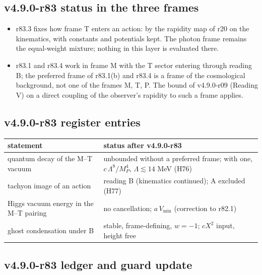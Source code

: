 \subsection*{v4.9.0-r83 status in the three frames}
\label{subsec:v490-r83-frames}

\begin{itemize}[leftmargin=2em]
\item r83.3 fixes how frame T enters an action: by the rapidity map of r20 on the kinematics, with constants and potentials kept.  The
photon frame remains the equal-weight mixture; nothing in this layer is evaluated there.
\item r83.1 and r83.4 work in frame M with the T sector entering through reading B; the preferred frame of r83.1(b) and r83.4 is a
frame of the cosmological background, not one of the frames M, T, P.  The bound of v4.9.0-r09 (Reading V) on a direct coupling of the
observer's rapidity to such a frame applies.
\end{itemize}

\subsection*{v4.9.0-r83 register entries}
\label{subsec:v490-r83-register}

\begin{center}
\small
\begin{tabular}{@{}>{\raggedright\arraybackslash}p{}>{\raggedright\arraybackslash}p{}@{}}
\toprule
statement & status after v4.9.0-r83\\
\midrule
quantum decay of the M--T vacuum & unbounded without a preferred frame; with one, \(c\,\Lambda^8/M_P^4\), \(\Lambda\lesssim14\) MeV (H76)\\
tachyon image of an action & reading B (kinematics continued); A excluded (H77)\\
Higgs vacuum energy in the M--T pairing & no cancellation; \(a\,V_{\min}\) (correction to r82.1)\\
ghost condensation under B & stable, frame-defining, \(w=-1\); \(cX^2\) input, height free\\
\bottomrule
\end{tabular}
\end{center}

\subsection*{v4.9.0-r83 ledger and guard update}
\label{subsec:v490-r83-ledger-guard}

